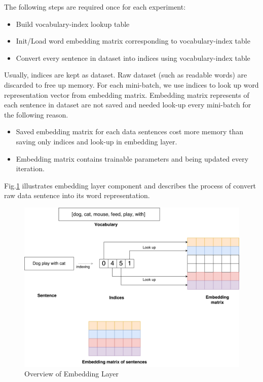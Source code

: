 The following steps are required once for each experiment:
\begin{itemize}
    \item Build vocabulary-index lookup table
    \item Init/Load word embedding matrix corresponding to vocabulary-index table
    \item Convert every sentence in dataset into indices using vocabulary-index table  
\end{itemize}
Usually, indices are kept as dataset. Raw dataset (such as readable words) are discarded to free up memory. For each mini-batch, we use indices to look up word representation vector from embedding matrix. Embedding matrix represents of each sentence in dataset are not saved and needed look-up every mini-batch for the following reason.
\begin{itemize}
    \item Saved embedding matrix for each data sentences cost more memory than saving only indices and look-up in embedding layer.
    \item Embedding matrix contains trainable parameters and being updated every iteration.
\end{itemize}

Fig.\ref{fig:embeddinglayer} illustrates embedding layer component and describes the process of convert raw data sentence into its word representation.

\begin{figure}[H]
    \centering
    \includegraphics[width=0.9\linewidth]{figure/embeddinglayer.pdf}
    \caption[Overview of embedding layer]{Overview of Embedding Layer}
    \label{fig:embeddinglayer}
\end{figure}



